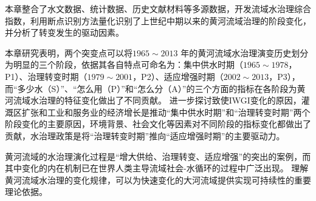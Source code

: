 本章整合了水文数据、统计数据、历史文献材料等多源数据，开发流域水治理综合指数，利用断点识别方法量化识别了上世纪中期以来的黄河流域治理的阶段变化，并分析了转变发生的驱动因素。

本章研究表明，两个突变点可以将$1965 \sim 2013$ 年的黄河流域水治理演变历史划分为明显的三个阶段，依据其各自特点可命名为：集中供水时期（$1965 \sim 1978$，P1）、治理转变时期（$1979 \sim 2001$，P2）、适应增强时期（$2002 \sim 2013$，P3），而“多少水（S）”、“怎么用（P）”和“怎么分（A）”的三个方面的指标在各阶段为黄河流域水治理的特征变化做出了不同贡献。
进一步探讨致使IWGI变化的原因，灌溉区扩张和工业和服务业的经济增长是推动“集中供水时期”和“治理转变时期”两个阶段变化的主要原因，环境背景、社会文化等因素对不同阶段的指标变化都做出了贡献，水治理政策是将“治理转变时期”推向“适应增强时期”的主要驱动力。

黄河流域的水治理演化过程是“增大供给、治理转变、适应增强”的突出的案例，而其中变化的内在机制已在世界人类主导流域社会-水循环的过程中广泛出现。
理解黄河流域水治理的变化规律，可以为快速变化的大河流域提供实现可持续性的重要理论依据。
